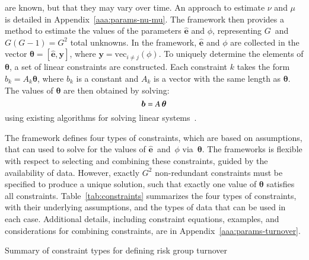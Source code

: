 are known, but that they may vary over time.
An approach to estimate $\nu$ and $\mu$ is detailed in Appendix~\ref{aaa:params-nu-mu}.
The framework then provides a method to estimate
the values of the parameters $\bm{\hat{e}}$ and $\phi$,
representing $G$~and~$G(G-1) = G^2$ total unknowns.
In the framework,
$\bm{\hat{e}}$ and $\phi$ are collected in the vector
$\bm{\theta} = \left[\bm{\hat{e}}, \bm{y}\right]$,
where $\bm{y} = \mathrm{vec}_{i \ne j}(\phi)$.
To uniquely determine the elements of $\bm{\theta}$,
a set of linear constraints are constructed.
Each constraint $k$ takes the form
$b_k = A_k \bm{\theta}$,
where $b_k$ is a constant and $A_k$ is a vector with the same length as $\bm{\theta}$.
The values of $\bm{\theta}$ are then obtained by solving:
\begin{equation}\label{eq:system-matrix}
\bm{b} = A \thinspace \bm{\theta}
\end{equation}
using existing algorithms for solving linear systems~\citep{LAPACK}.
\par
The framework defines four types of constraints, which are based on assumptions,
that can used to solve for the values of
$\bm{\hat{e}}$~and~$\phi$ via~$\bm{\theta}$.
The frameworks is flexible with respect to
selecting and combining these constraints,
guided by the availability of data.
However, exactly $G^2$ non-redundant constraints must be specified
to produce a unique solution,
such that exactly one value of $\bm{\theta}$ satisfies all constraints.
Table~\ref{tab:constraints} summarizes
the four types of constraints,
with their underlying assumptions,
and the types of data that can be used in each case.
Additional details, including
constraint equations, examples, and considerations for combining constraints,
are in Appendix~\ref{aaa:params-turnover}.
\begin{table}
  \caption{Summary of constraint types for defining risk group turnover}
  \label{tab:constraints}
  
\end{table}
